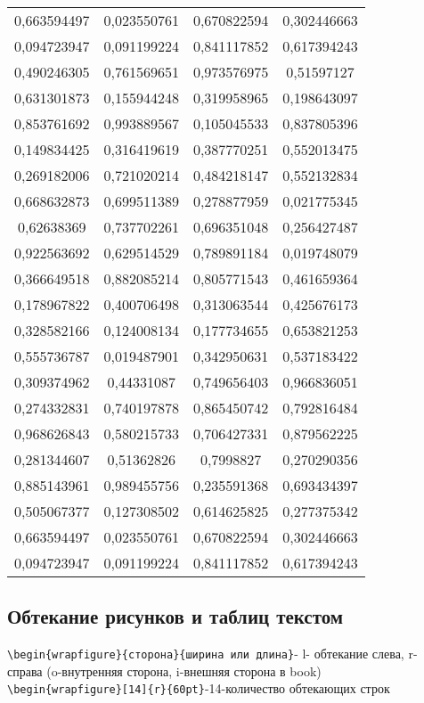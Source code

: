 \documentclass[a4paper,12pt]{article}%
\theoremstyle{plain}%
\theoremstyle{definition}%
\theoremstyle{remark}%
\begin{document}
\begin{longtable}{|c|c|c|c|}
0,663594497 & 0,023550761 & 0,670822594 & 0,302446663 \\
0,094723947 & 0,091199224 & 0,841117852 & 0,617394243 \\
0,490246305 & 0,761569651 & 0,973576975 & 0,51597127 \\
0,631301873 & 0,155944248 & 0,319958965 & 0,198643097 \\
0,853761692 & 0,993889567 & 0,105045533 & 0,837805396 \\
0,149834425 & 0,316419619 & 0,387770251 & 0,552013475 \\
0,269182006 & 0,721020214 & 0,484218147 & 0,552132834 \\
0,668632873 & 0,699511389 & 0,278877959 & 0,021775345 \\
0,62638369 & 0,737702261 & 0,696351048 & 0,256427487 \\
0,922563692 & 0,629514529 & 0,789891184 & 0,019748079 \\
0,366649518 & 0,882085214 & 0,805771543 & 0,461659364 \\
0,178967822 & 0,400706498 & 0,313063544 & 0,425676173 \\
0,328582166 & 0,124008134 & 0,177734655 & 0,653821253 \\
0,555736787 & 0,019487901 & 0,342950631 & 0,537183422 \\
0,309374962 & 0,44331087 & 0,749656403 & 0,966836051 \\
0,274332831 & 0,740197878 & 0,865450742 & 0,792816484 \\
0,968626843 & 0,580215733 & 0,706427331 & 0,879562225 \\
0,281344607 & 0,51362826 & 0,7998827 & 0,270290356 \\
0,885143961 & 0,989455756 & 0,235591368 & 0,693434397 \\
0,505067377 & 0,127308502 & 0,614625825 & 0,277375342 \\
0,663594497 & 0,023550761 & 0,670822594 & 0,302446663 \\
0,094723947 & 0,091199224 & 0,841117852 & 0,617394243 \\
\end{longtable}



\subsection{Обтекание рисунков и таблиц текстом}

\verb|\begin{wrapfigure}{сторона}{ширина или длина}|- l- обтекание слева, r- справа (o-внутренняя сторона, i-внешняя сторона в book) \\
\verb|\begin{wrapfigure}[14]{r}{60pt}|-14-количество обтекающих строк \\
\end{document}

